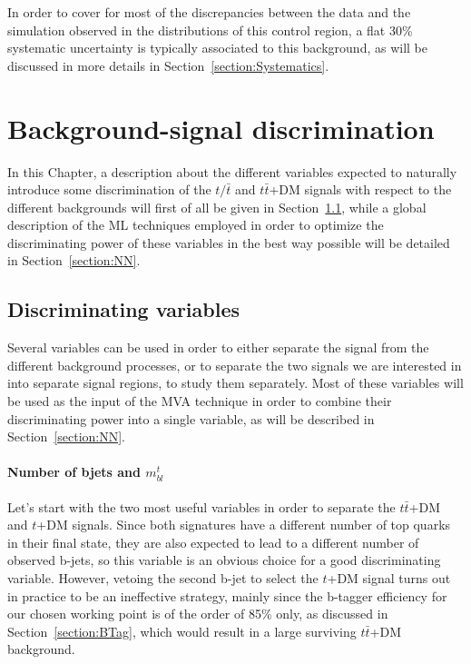 \documentclass[a4paper, 10pt, openright]{report}
\begin{document}
In order to cover for most of the discrepancies between the data and the simulation observed in the distributions of this control region, a flat 30\% systematic uncertainty is typically associated to this background, as will be discussed in more details in Section~\ref{section:Systematics}.


























\chapter{Background-signal discrimination} \label{section:Discrimination}

In this Chapter, a description about the different variables expected to naturally introduce some discrimination of the $t/\bar t$ and $t \bar t$+DM signals with respect to the different backgrounds will first of all be given in Section~\ref{section:Variables}, while a global description of the \ac{ML} techniques employed in order to optimize the discriminating power of these variables in the best way possible will be detailed in Section~\ref{section:NN}.

\section{Discriminating variables} \label{section:Variables}

Several variables can be used in order to either separate the signal from the different background processes, or to separate the two signals we are interested in into separate signal regions, to study them separately. Most of these variables will be used as the input of the \ac{MVA} technique in order to combine their discriminating power into a single variable, as will be described in Section~\ref{section:NN}.

\subsubsection*{Number of bjets and $m_{bl}^t$}

Let's start with the two most useful variables in order to separate the $t \bar t$+DM and $t$+DM signals. Since both signatures have a different number of top quarks in their final state, they are also expected to lead to a different number of observed b-jets, so this variable is an obvious choice for a good discriminating variable. However, vetoing the second b-jet to select the $t$+DM signal turns out in practice to be an ineffective strategy, mainly since the b-tagger efficiency for our chosen working point is of the order of 85\% only, as discussed in Section~\ref{section:BTag}, which would result in a large surviving $t \bar t$+DM background.
\end{document}
